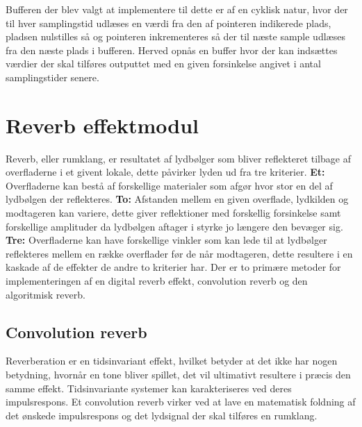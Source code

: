 Bufferen der blev valgt at implementere til dette er af en cyklisk natur, hvor der til hver samplingstid udlæses en værdi fra den af pointeren indikerede plads, pladsen nulstilles så og pointeren inkrementeres så der til næste sample udlæses fra den næste plads i bufferen.
Herved opnås en buffer hvor der kan indsættes værdier der skal tilføres outputtet med en given forsinkelse angivet i antal samplingstider senere.

\section{Reverb effektmodul}\label{sec:reverb}
Reverb, eller rumklang, er resultatet af lydbølger som bliver reflekteret tilbage af %
overfladerne i et givent lokale, dette påvirker lyden ud fra tre kriterier.\newline 
\textbf{Et:} Overfladerne kan bestå af forskellige materialer som afgør hvor stor en del af lydbølgen der reflekteres.\newline 
\textbf{To:} Afstanden mellem en given overflade, lydkilden og modtageren kan variere, dette giver reflektioner med forskellig forsinkelse samt forskellige amplituder da lydbølgen aftager i styrke jo længere den bevæger sig.\newline 
\textbf{Tre:} Overfladerne kan have forskellige vinkler som kan lede til at lydbølger reflekteres mellem en række overflader før de når modtageren, dette resultere i en kaskade af de effekter de andre to kriterier har.\newline
Der er to primære metoder for implementeringen af en digital reverb effekt, convolution reverb og den algoritmisk reverb.

\subsection{Convolution reverb}
Reverberation er en tidsinvariant effekt, hvilket betyder at det ikke har nogen betydning, hvornår en tone bliver spillet, det vil ultimativt resultere i præcis den samme effekt. \newline
Tidsinvariante systemer kan karakteriseres ved deres impulsrespons.
Et convolution reverb virker ved at lave en matematisk foldning af det ønskede %
impulsrespons og det lydsignal der skal tilføres en rumklang.\newline 

